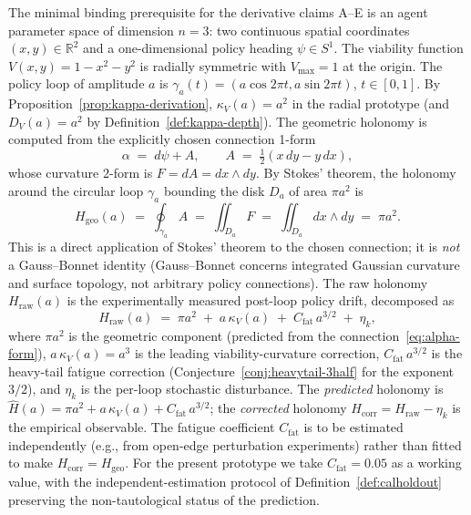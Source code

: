 \documentclass[11pt,a4paper]{article}
\theoremstyle{plain}
\theoremstyle{definition}
\theoremstyle{remark}
\newcommand{\kk}{\kappa_{\!V}}
\newcommand{\RR}{\mathbb{R}}
\begin{document}
The minimal binding prerequisite for the derivative claims A--E is an
agent parameter space of dimension $n=3$: two continuous spatial
coordinates $(x,y)\in\RR^2$ and a one-dimensional policy heading
$\psi\in S^1$. The viability function $V(x,y) = 1 - x^2 - y^2$ is
radially symmetric with $V_{\max}=1$ at the origin. The policy loop of
amplitude $a$ is $\gamma_a(t) = (a\cos 2\pi t, a\sin 2\pi t)$, $t\in
[0,1]$. By Proposition~\ref{prop:kappa-derivation},
$\kk(a) = a^2$ in the radial prototype (and $D_V(a) = a^2$ by
Definition~\ref{def:kappa-depth}). The geometric holonomy is computed
from the explicitly chosen connection 1-form
\begin{equation}\label{eq:alpha-form}
  \alpha \;=\; d\psi + A,\qquad A \;=\; \tfrac{1}{2}(x\,dy - y\,dx),
\end{equation}
whose curvature $2$-form is $F = dA = dx \wedge dy$. By Stokes'
theorem, the holonomy around the circular loop $\gamma_a$ bounding the
disk $D_a$ of area $\pi a^2$ is
\begin{equation}\label{eq:Hgeo-stokes}
  H_{\mathrm{geo}}(a) \;=\; \oint_{\gamma_a}\! A
  \;=\; \iint_{D_a}\! F \;=\; \iint_{D_a}\! dx \wedge dy
  \;=\; \pi a^2.
\end{equation}
This is a direct application of Stokes' theorem to the chosen
connection; it is \emph{not} a Gauss--Bonnet identity (Gauss--Bonnet
concerns integrated Gaussian curvature and surface topology, not
arbitrary policy connections). The raw holonomy $H_{\mathrm{raw}}(a)$
is the experimentally measured post-loop policy drift, decomposed as
\begin{equation}\label{eq:Hraw}
  H_{\mathrm{raw}}(a) \;=\; \pi a^2 \;+\; a\,\kk(a) \;+\;
  C_{\mathrm{fat}}\,a^{3/2} \;+\; \eta_k,
\end{equation}
where $\pi a^2$ is the geometric component (predicted from the
connection~\eqref{eq:alpha-form}), $a\,\kk(a) = a^3$ is the leading
viability-curvature correction, $C_{\mathrm{fat}}\,a^{3/2}$ is the
heavy-tail fatigue correction (Conjecture~\ref{conj:heavytail-3half}
for the exponent $3/2$), and $\eta_k$ is the per-loop stochastic
disturbance. The \emph{predicted} holonomy is
$\widehat H(a) = \pi a^2 + a\,\kk(a) + C_{\mathrm{fat}}\,a^{3/2}$;
the \emph{corrected} holonomy $H_{\mathrm{corr}} = H_{\mathrm{raw}} -
\eta_k$ is the empirical observable. The fatigue coefficient
$C_{\mathrm{fat}}$ is to be estimated independently (e.g., from
open-edge perturbation experiments) rather than fitted to make
$H_{\mathrm{corr}} = H_{\mathrm{geo}}$. For the present prototype we
take $C_{\mathrm{fat}} = 0.05$ as a working value, with the
independent-estimation protocol of Definition~\ref{def:calholdout}
preserving the non-tautological status of the prediction.
\end{document}
